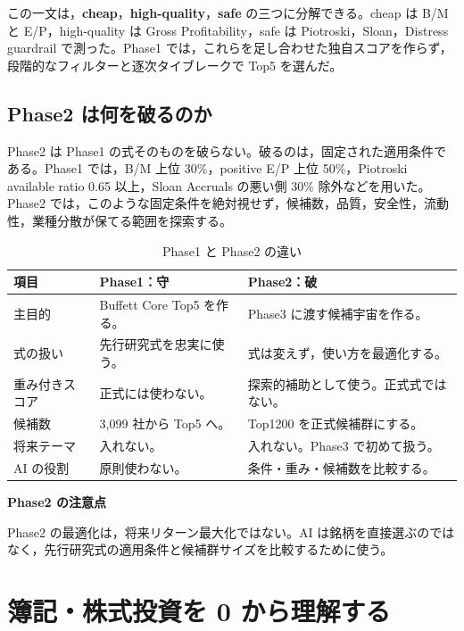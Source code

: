 \documentclass[a4paper,10pt]{article}
\newcommand{\smalltable}{\fontsize{8.7pt}{11pt}\selectfont}
\begin{document}
この一文は，\textbf{cheap}，\textbf{high-quality}，\textbf{safe} の三つに分解できる。cheap は B/M と E/P，high-quality は Gross Profitability，safe は Piotroski，Sloan，Distress guardrail で測った。Phase1 では，これらを足し合わせた独自スコアを作らず，段階的なフィルターと逐次タイブレークで Top5 を選んだ。

\subsection{Phase2 は何を破るのか}
Phase2 は Phase1 の式そのものを破らない。破るのは，固定された適用条件である。Phase1 では，B/M 上位 30\%，positive E/P 上位 50\%，Piotroski available ratio 0.65 以上，Sloan Accruals の悪い側 30\% 除外などを用いた。Phase2 では，このような固定条件を絶対視せず，候補数，品質，安全性，流動性，業種分散が保てる範囲を探索する。

\begin{table}[H]
\caption{Phase1 と Phase2 の違い}
\centering\smalltable
\begin{tabularx}{\linewidth}{p{30mm}YY}
\toprule
項目 & Phase1：守 & Phase2：破 \\
\midrule
主目的 & Buffett Core Top5 を作る。 & Phase3 に渡す候補宇宙を作る。 \\
式の扱い & 先行研究式を忠実に使う。 & 式は変えず，使い方を最適化する。 \\
重み付きスコア & 正式には使わない。 & 探索的補助として使う。正式式ではない。 \\
候補数 & 3,099 社から Top5 へ。 & Top1200 を正式候補群にする。 \\
将来テーマ & 入れない。 & 入れない。Phase3 で初めて扱う。 \\
AI の役割 & 原則使わない。 & 条件・重み・候補数を比較する。 \\
\bottomrule
\end{tabularx}
\end{table}

\begin{keybox}
\textbf{Phase2 の注意点}\par
Phase2 の最適化は，将来リターン最大化ではない。AI は銘柄を直接選ぶのではなく，先行研究式の適用条件と候補群サイズを比較するために使う。
\end{keybox}

\section{簿記・株式投資を 0 から理解する}
\end{document}
